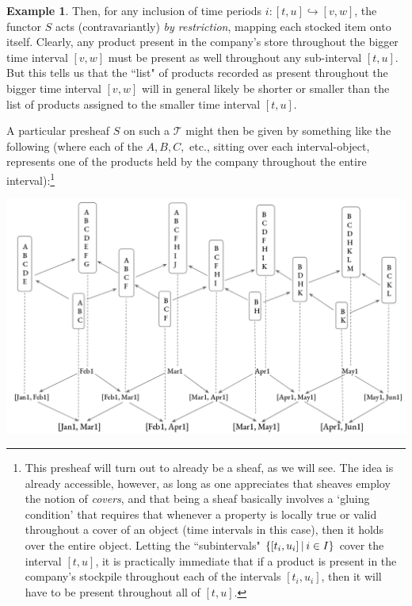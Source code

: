 \documentclass[11pt]{book}
\theoremstyle{definition}
\newtheorem{example}{Example}[section]
\theoremstyle{definition}
\theoremstyle{definition}
\theoremstyle{theorem}
\theoremstyle{definition}
\begin{document}
\begin{example}
Then, for any inclusion of time periods $i: [t,u] \hookrightarrow [v,w]$, the functor $S$ acts (contravariantly) \textit{by restriction}, mapping each stocked item onto itself. Clearly, any product present in the company's store throughout the bigger time interval $[v,w]$ must be present as well throughout any sub-interval $[t,u]$. But this tells us that the ``list" of products recorded as present throughout the bigger time interval $[v,w]$ will in general likely be shorter or smaller than the list of products assigned to the smaller time interval $[t,u]$. \par 
A particular presheaf $S$ on such a $\mathcal{T}$ might then be given by something like the following (where each of the $A, B, C,$ etc., sitting over each interval-object, represents one of the products held by the company throughout the entire interval):\footnote{This presheaf will turn out to already be a sheaf, as we will see. The idea is already accessible, however, as long as one appreciates that sheaves employ the notion of \textit{covers}, and that being a sheaf basically involves a `gluing condition' that requires that whenever a property is locally true or valid throughout a cover of an object (time intervals in this case), then it holds over the entire object. Letting the ``subintervals" $\{[t_i, u_i] \hspace*{0.2em}|\hspace*{0.2em} i \in I \}$ cover the interval $[t,u]$, it is practically immediate that if a product is present in the company's stockpile throughout each of the intervals $[t_i, u_i]$, then it will have to be present throughout all of $[t,u]$.} 
\begin{center}
	\includegraphics*[scale=0.3]{TimeIntervalSheafDiagram.png}
\end{center}

\end{example}
\end{document}
